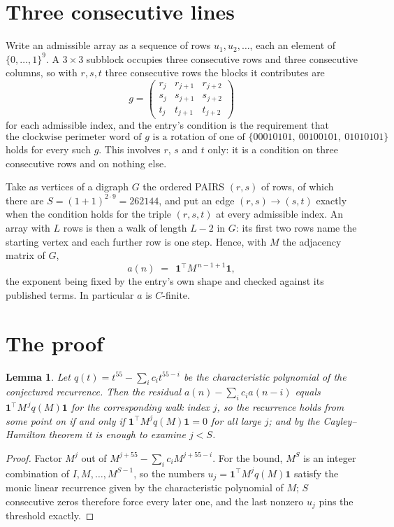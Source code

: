 \documentclass[11pt,a4paper]{article}
\theoremstyle{plain}
\newtheorem{lemma}[theorem]{Lemma}
\theoremstyle{definition}
\begin{document}
\section{Three consecutive lines}

Write an admissible array as a sequence of rows $u_1,u_2,\dots$, each an element of
$\{0,\dots,1\}^{9}$. A $3\times3$ subblock occupies three consecutive rows and
three consecutive columns, so with $r,s,t$ three consecutive rows the blocks it
contributes are
\[
g=\begin{pmatrix}r_j&r_{j+1}&r_{j+2}\\ s_j&s_{j+1}&s_{j+2}\\ t_j&t_{j+1}&t_{j+2}\end{pmatrix}
\]
for each admissible index, and the entry's condition is the requirement that
\[
\text{the clockwise perimeter word of }g\text{ is a rotation of one of }\{00010101,\ 00100101,\ 01010101\}
\]
holds for every such $g$. This involves $r$, $s$ and $t$ only: it is a condition on
three consecutive rows and on nothing else.

Take as vertices of a digraph $G$ the ordered PAIRS $(r,s)$ of rows, of which there are
$S=(1+1)^{2\cdot9}=262144$, and put an edge $(r,s)\to(s,t)$ exactly when the condition
holds for the triple $(r,s,t)$ at every admissible index. An array with $L$ rows is then a
walk of length $L-2$ in $G$: its first two rows name the starting vertex and each further
row is one step. Hence, with $M$ the adjacency matrix of $G$,
\[
a(n)\;=\;\,\mathbf{1}^{\!\top}M^{\,n-1+1}\mathbf{1},
\]
the exponent being fixed by the entry's own shape and checked against its published terms.
In particular $a$ is $C$-finite.

\section{The proof}

\begin{lemma}\label{lem:crit}
Let $q(t)=t^{55}-\sum_i c_it^{55-i}$ be the characteristic polynomial of the
conjectured recurrence. Then the residual $a(n)-\sum_ic_ia(n-i)$ equals
$\mathbf{1}^{\!\top}M^{\,j}q(M)\mathbf{1}$ for the corresponding walk index
$j$, so the recurrence holds from some point on if and only if
$\mathbf{1}^{\!\top}M^{j}q(M)\mathbf{1}=0$ for all large $j$; and by the
Cayley--Hamilton theorem it is enough to examine $j<S$.
\end{lemma}

\begin{proof}
Factor $M^{j}$ out of $M^{j+55}-\sum_ic_iM^{j+55-i}$. For the bound, $M^{S}$
is an integer combination of $I,M,\dots,M^{S-1}$, so the numbers
$u_j=\mathbf{1}^{\!\top}M^{j}q(M)\mathbf{1}$ satisfy the monic linear recurrence given by
the characteristic polynomial of $M$; $S$ consecutive zeros therefore force every later one,
and the last nonzero $u_j$ pins the threshold exactly.
\end{proof}
\end{document}
